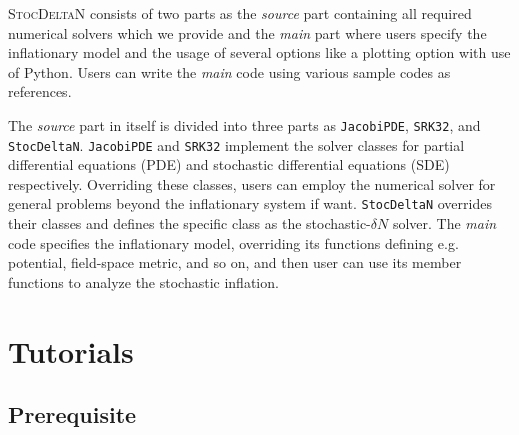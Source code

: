 \documentclass[aps, prd
, preprint
, nofootinbib 
, notitlepage
, superscriptaddress
, longbibliography
]{revtex4-1}
\begin{document}
\textsc{StocDeltaN} consists of two parts as the \emph{source} part containing all required numerical solvers which we provide and the \emph{main} part where users specify the inflationary model
and the usage of several options like a plotting option with use of Python. Users can write the \emph{main} code using various sample codes as references.

The \emph{source} part in itself is divided into three parts as \texttt{JacobiPDE}, \texttt{SRK32}, and \texttt{StocDeltaN}.
\texttt{JacobiPDE} and \texttt{SRK32} implement the solver classes for partial differential equations (PDE) and stochastic differential equations (SDE) respectively.
Overriding these classes, users can employ the numerical solver for general problems beyond the inflationary system if want.
\texttt{StocDeltaN} overrides their classes and defines the specific class as the stochastic-$\delta N$ solver.
The \emph{main} code specifies the inflationary model, overriding its functions defining e.g. potential, field-space metric, and so on,
and then user can use its member functions to analyze the stochastic inflation.

\newpage


\section{Tutorials}

\subsection{Prerequisite}
\end{document}
